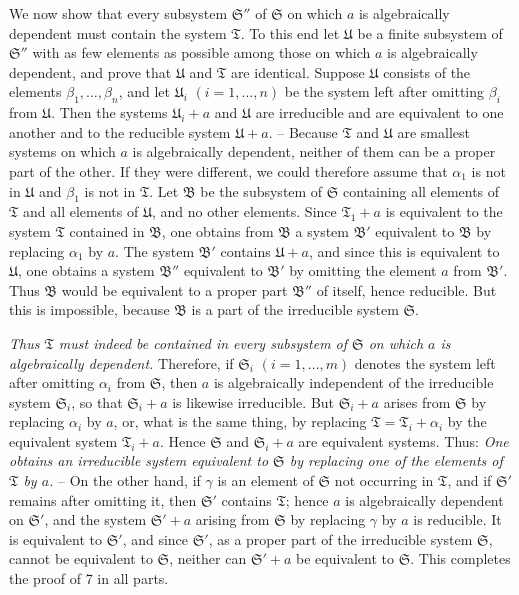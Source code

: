 We now show that every subsystem $\mathfrak S''$ of $\mathfrak S$ on which $a$ is algebraically dependent must contain the system $\mathfrak T$. To this end let $\mathfrak U$ be a finite subsystem of $\mathfrak S''$ with as few elements as possible among those on which $a$ is algebraically dependent, and prove that $\mathfrak U$ and $\mathfrak T$ are identical. Suppose $\mathfrak U$ consists of the elements $\beta_1,\ldots,\beta_n$, and let $\mathfrak U_i$ $(i=1,\ldots,n)$ be the system left after omitting $\beta_i$ from $\mathfrak U$. Then the systems $\mathfrak U_i+a$ and $\mathfrak U$ are irreducible and are equivalent to one another and to the reducible system $\mathfrak U+a$. -- Because $\mathfrak T$ and $\mathfrak U$ are smallest systems on which $a$ is algebraically dependent, neither of them can be a proper part of the other. If they were different, we could therefore assume that $\alpha_1$ is not in $\mathfrak U$ and $\beta_1$ is not in $\mathfrak T$. Let $\mathfrak B$ be the subsystem of $\mathfrak S$ containing all elements of $\mathfrak T$ and all elements of $\mathfrak U$, and no other elements. Since $\mathfrak T_1+a$ is equivalent to the system $\mathfrak T$ contained in $\mathfrak B$, one obtains from $\mathfrak B$ a system $\mathfrak B'$ equivalent to $\mathfrak B$ by replacing $\alpha_1$ by $a$. The system $\mathfrak B'$ contains $\mathfrak U+a$, and since this is equivalent to $\mathfrak U$, one obtains a system $\mathfrak B''$ equivalent to $\mathfrak B'$ by omitting the element $a$ from $\mathfrak B'$. Thus $\mathfrak B$ would be equivalent to a proper part $\mathfrak B''$ of itself, hence reducible. But this is impossible, because $\mathfrak B$ is a part of the irreducible system $\mathfrak S$.

\emph{Thus $\mathfrak T$ must indeed be contained in every subsystem of $\mathfrak S$ on which $a$ is algebraically dependent.} Therefore, if $\mathfrak S_i$ $(i=1,\ldots,m)$ denotes the system left after omitting $\alpha_i$ from $\mathfrak S$, then $a$ is algebraically independent of the irreducible system $\mathfrak S_i$, so that $\mathfrak S_i+a$ is likewise irreducible. But $\mathfrak S_i+a$ arises from $\mathfrak S$ by replacing $\alpha_i$ by $a$, or, what is the same thing, by replacing $\mathfrak T=\mathfrak T_i+\alpha_i$ by the equivalent system $\mathfrak T_i+a$. Hence $\mathfrak S$ and $\mathfrak S_i+a$ are equivalent systems. Thus: \emph{One obtains an irreducible system equivalent to $\mathfrak S$ by replacing one of the elements of $\mathfrak T$ by $a$.} -- On the other hand, if $\gamma$ is an element of $\mathfrak S$ not occurring in $\mathfrak T$, and if $\mathfrak S'$ remains after omitting it, then $\mathfrak S'$ contains $\mathfrak T$; hence $a$ is algebraically dependent on $\mathfrak S'$, and the system $\mathfrak S'+a$ arising from $\mathfrak S$ by replacing $\gamma$ by $a$ is reducible. It is equivalent to $\mathfrak S'$, and since $\mathfrak S'$, as a proper part of the irreducible system $\mathfrak S$, cannot be equivalent to $\mathfrak S$, neither can $\mathfrak S'+a$ be equivalent to $\mathfrak S$. This completes the proof of 7 in all parts.


